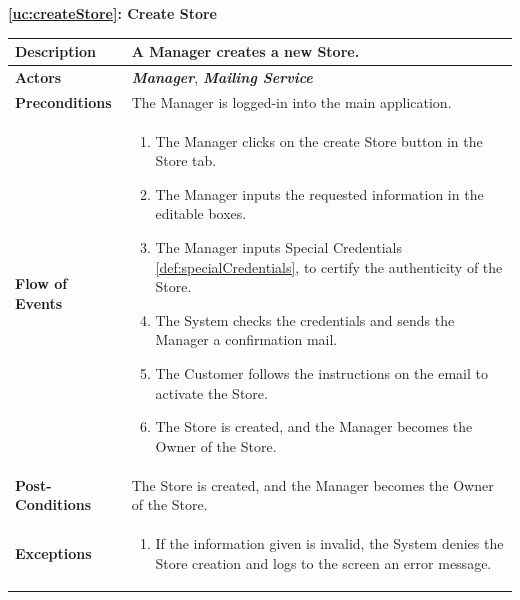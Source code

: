 \documentclass[a4paper, 12pt, oneside]{article}
\begin{document}
\begin{enumerate}[labelindent=20pt, label={UC.\arabic*}, itemindent=1em,leftmargin=!]
\begin{center}
{\textbf{\ref{uc:createStore}: Create Store}}
\end{center}
\begin{tabularx}{\linewidth}{| l | X |}
	
	\hline
	\textbf{Description} & A Manager creates a new Store.\\
	

	\hline
	\textbf{Actors} & \textbf{\textit{Manager}}, \textit{\textbf{Mailing Service}} \\
	
	\hline
	\textbf{Preconditions} & The Manager is logged-in into the main application. \\
	
	\hline
	\textbf{Flow of Events} & \parbox{0.7\textwidth}{	
		\begin{enumerate}
			\item The Manager clicks on the create Store button in the Store tab.
			\item The Manager inputs the requested information in the editable boxes.
			\item The Manager inputs Special Credentials \ref{def:specialCredentials}, to certify the authenticity of the Store.
			\item The System checks the credentials and sends the Manager a confirmation mail.
			\item The Customer follows the instructions on the email to activate the Store.
			\item The Store is created, and the Manager becomes the Owner of the Store.
	\end{enumerate}}\\
	
	\hline
	\textbf{Post-Conditions} & The Store is created, and the Manager becomes the Owner of the Store.\\
	
	\hline
	\textbf{Exceptions} & \parbox{0.7\textwidth}{ \begin{enumerate}
			\item If the information given is invalid, the System denies the Store creation and logs to the screen an error message.
		\end{enumerate}}\\


\end{tabularx}
\end{enumerate}
\end{document}
